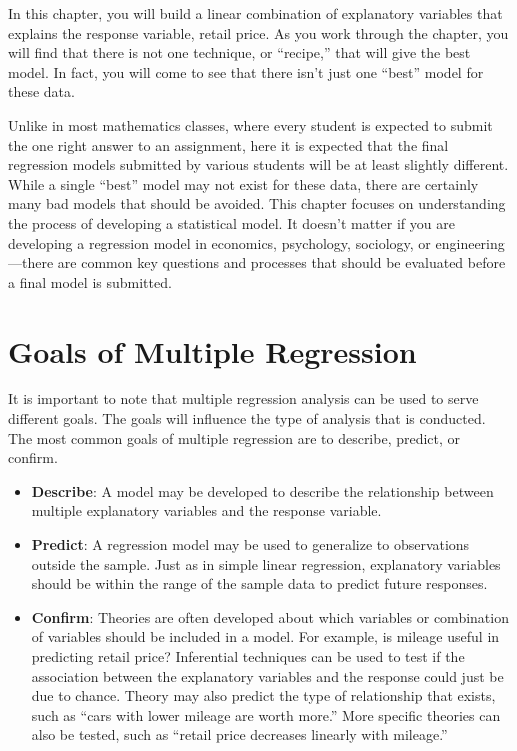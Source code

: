 \documentclass[
]{report}
\providecommand{\tightlist}{%
  \setlength{\itemsep}{0pt}\setlength{\parskip}{0pt}}
\begin{document}
In this chapter, you will build a linear combination of explanatory variables that explains the response variable, retail price. As you work through the chapter, you will find that there is not one technique, or ``recipe,'' that will give the best model. In fact, you will come to see that there isn't just one ``best'' model for these data.

Unlike in most mathematics classes, where every student is expected to submit the one right answer to an assignment, here it is expected that the final regression models submitted by various students will be at least slightly different. While a single ``best'' model may not exist for these data, there are certainly many bad models that should be avoided. This chapter focuses on understanding the process of developing a statistical
model. It doesn't matter if you are developing a regression model in economics, psychology, sociology, or engineering---there are common key questions and processes that should be evaluated before a final model is submitted.

\hypertarget{goals-of-multiple-regression}{%
\section{\texorpdfstring{\textbf{Goals of Multiple Regression}}{Goals of Multiple Regression}}\label{goals-of-multiple-regression}}

It is important to note that multiple regression analysis can be used to serve different goals. The goals will influence the type of analysis that is conducted. The most common goals of multiple regression are to describe, predict, or confirm.

\begin{itemize}
\tightlist
\item
  \textbf{Describe}: A model may be developed to describe the relationship between multiple explanatory variables and the response variable.
\item
  \textbf{Predict}: A regression model may be used to generalize to observations outside the sample. Just as in simple linear regression, explanatory variables should be within the range of the sample data to predict future responses.
\item
  \textbf{Confirm}: Theories are often developed about which variables or combination of variables should be included in a model. For example, is mileage useful in predicting retail price? Inferential techniques can be used to test if the association between the explanatory variables and the response could just be due to chance. Theory may also predict the type of relationship that exists, such as ``cars with lower mileage are worth more.'' More specific theories can also be tested, such as ``retail price decreases linearly with mileage.''
\end{itemize}
\end{document}
